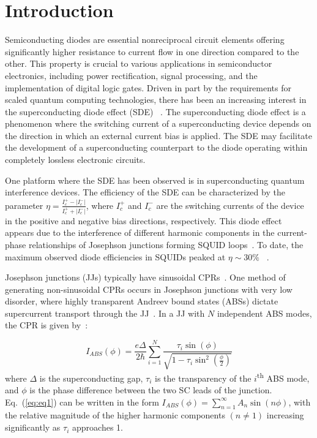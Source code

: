 \documentclass[%
 reprint,
 amsmath,amssymb,
 aps,
]{revtex4-2}
\begin{document}
\section{Introduction}
Semiconducting diodes are essential nonreciprocal circuit elements offering significantly higher resistance to current flow in one direction compared to the other. This property is crucial to various applications in semiconductor electronics, including power rectification, signal processing, and the implementation of digital logic gates. Driven in part by the requirements for scaled quantum computing technologies, there has been an increasing interest in the superconducting diode effect (SDE) ~\cite{Marcus2024,Marcus2025,Nichele2024,Schonenberger2023,Greco2024,Leblanc2024,Baumgartner2022,Ando2020,ThinFilmTheory2022,Hou2023,RashbaTheory2022,Graphene2022,GrapheneTheory2022,vdW2022,vdWTheory2022,TopoJJ2018,TopoJJ2020,FiniteA2022,FiniteB2022,FiniteC2022,Tarucha2023,TaruchaAnomalous,Regensberg2023,Regensberg2024,Regensberg2025,SDEReview2025}. The superconducting diode effect is a phenomenon where the switching current of a superconducting device depends on the direction in which an external current bias is applied. The SDE may facilitate the development of a superconducting counterpart to the diode operating within completely lossless electronic circuits.
\par
One platform where the SDE has been observed is in superconducting quantum interference devices. The efficiency of the SDE can be characterized by the parameter $\eta=\frac{I_c^+-|I_c^-|}{I_c^++|I_c^-|}$, where $I_c^+$ and $I_c^-$ are the switching currents of the device in the positive and negative bias directions, respectively. This diode effect appears due to the interference of different harmonic components in the current-phase relationships of Josephson junctions forming SQUID loops~\cite{Souto2022,SDEReview2025}. To date, the maximum observed diode efficiencies in SQUIDs peaked at $\eta \sim 30\%$ ~\cite{Marcus2024,Marcus2025,Nichele2024,Schonenberger2023,Greco2024,Leblanc2024}.

Josephson junctions (JJs) typically have sinusoidal CPRs~\cite{Josephson1962,JJReview2004}. One method of generating non-sinusoidal CPRs occurs in Josephson junctions with very low disorder, where highly transparent Andreev bound states (ABSs) dictate supercurrent transport through the JJ~\cite{Likharev1979,DellaRocca2007,Ciaccia2024,Nichele2020}. In a JJ with $N$ independent ABS modes, the CPR is given by~\cite{ABS1991}:

\begin{equation}
    \label{eq:eq1}
    I_{ABS}(\phi) = \frac{e \Delta}{2\hbar}\sum_{i=1}^N {\frac{\tau_{i} \sin(\phi)}{\sqrt{1-\tau_{i} \sin^2(\frac{\phi}{2})}}}
\end{equation}
where $\Delta$ is the superconducting gap, $\tau_i$ is the transparency of the $i$\textsuperscript{th} ABS mode, and $\phi$ is the phase difference between the two SC leads of the junction. Eq.~(\ref{eq:eq1}) can be written in the form $I_{ABS}(\phi)=\sum_{n=1}^{\infty}A_n\sin(n\phi)$, with the relative magnitude of the higher harmonic components $(n \neq 1)$ increasing significantly as $\tau_i$ approaches 1.
\end{document}
